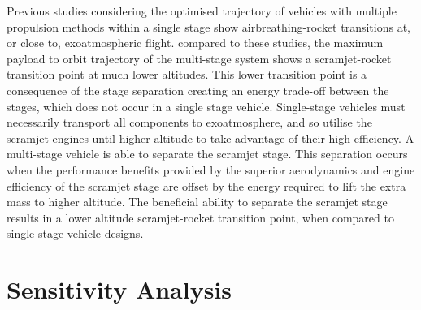 Previous studies considering the optimised trajectory of vehicles with multiple propulsion methods within a single stage show airbreathing-rocket transitions at, or close to, exoatmospheric flight\cite{Lu1993,Trefny1999,Bradford2000}. compared to these studies, the maximum payload to orbit trajectory of the multi-stage system shows a scramjet-rocket transition point at much lower altitudes.
This lower transition point is a consequence of the stage separation creating an energy trade-off between the stages, which does not occur in a single stage vehicle. Single-stage vehicles must necessarily transport all components to exoatmosphere, and so utilise the scramjet engines until higher altitude to take advantage of their high efficiency. A multi-stage vehicle is able to separate the scramjet stage. 
This separation occurs when the performance benefits provided by the superior aerodynamics and engine efficiency of the scramjet stage are offset by the energy required to lift the extra mass to higher altitude. The beneficial ability
to separate the scramjet stage results in a lower altitude scramjet-rocket transition point, when compared to single
stage vehicle designs.



\section{Sensitivity Analysis}\label{sec:sensitivityNoReturn}


